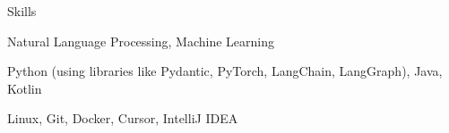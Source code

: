 \begin{rubric}{Skills}

\entry*[Research]
Natural Language Processing, Machine Learning

\entry*[Programming]
Python (using libraries like Pydantic, PyTorch, LangChain, LangGraph), Java, Kotlin

Linux, Git, Docker, Cursor, IntelliJ IDEA

\end{rubric}
